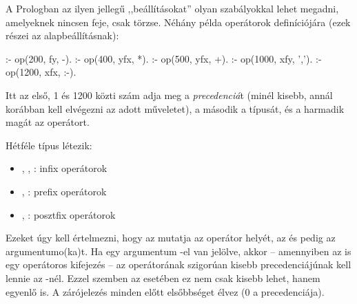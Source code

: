 A Prologban az ilyen jellegű ,,beállításokat'' olyan
szabályokkal lehet megadni, amelyeknek nincsen feje,
csak törzse. Néhány példa operátorok definíciójára
(ezek részei az alapbeállításnak):
\begin{program}
:- op(200, fy, -).
:- op(400, yfx, *).
:- op(500, yfx, +).
:- op(1000, xfy, ',').
:- op(1200, xfx, :-).
\end{program}
Itt az első, 1 és 1200 közti szám adja meg a
\emph{precedenciá}\/t (minél kisebb, annál korábban
kell elvégezni az adott műveletet), a második a
típusát, és a harmadik magát az operátort.

Hétféle típus létezik:
\begin{itemize}
\item {}, , : infix operátorok
\item {}, : prefix operátorok
\item {}, : posztfix operátorok
\end{itemize}

Ezeket úgy kell értelmezni, hogy az  mutatja
az operátor helyét, az  és  pedig az
argumentumo(ka)t. Ha egy argumentum -el van
jelölve, akkor -- amennyiben az is egy operátoros
kifejezés -- az  operátorának szigorúan kisebb
precedenciájúnak kell lennie az -nél. Ezzel
szemben az  esetében ez nem csak kisebb lehet,
hanem egyenlő is. A zárójelezés minden előtt
elsőbbséget élvez (0 a precedenciája).


